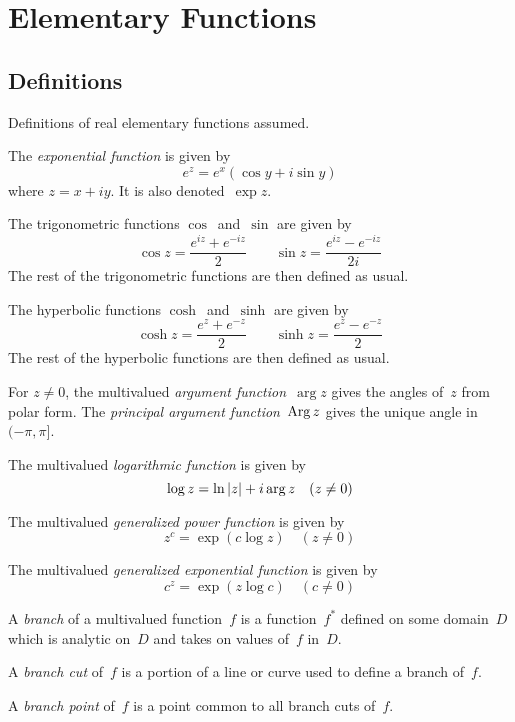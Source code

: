 %
%
%
\section{Elementary Functions}
\subsection*{Definitions}
Definitions of real elementary functions assumed.
\begin{defn}
The \emph{exponential function} is given by
\[e^z=e^x(\cos y+i\sin y)\]
where \(z=x+iy\). It is also denoted~\(\exp z\).
\end{defn}
\begin{defn}
The trigonometric functions \(\cos\)~and~\(\sin\) are given by
\[\cos z=\frac{e^{iz}+e^{-iz}}{2}\qquad\sin z=\frac{e^{iz}-e^{-iz}}{2i}\]
The rest of the trigonometric functions are then defined as usual.
\end{defn}
\begin{defn}
The hyperbolic functions \(\cosh\)~and~\(\sinh\) are given by
\[\cosh z=\frac{e^z+e^{-z}}{2}\qquad\sinh z=\frac{e^z-e^{-z}}{2}\]
The rest of the hyperbolic functions are then defined as usual.
\end{defn}
\begin{defn}
For \(z\ne0\), the multivalued \emph{argument function}~\(\arg z\) gives the angles of~\(z\) from polar form. The \emph{principal argument function}~\(\operatorname{Arg} z\) gives the unique angle in \((-\pi,\pi]\).
\end{defn}
\begin{defn}
The multivalued \emph{logarithmic function} is given by
\[\log z=\ln|{z}|+i\arg z\quad(z\ne0)\]
\end{defn}
\begin{defn}
The multivalued \emph{generalized power function} is given by
\[z^c=\exp(c\log z)\quad(z\ne0)\]
\end{defn}
\begin{defn}
The multivalued \emph{generalized exponential function} is given by
\[c^z=\exp(z\log c)\quad(c\ne0)\]
\end{defn}

\begin{defn}
A \emph{branch} of a multivalued function~\(f\) is a function~\(f^*\) defined on some domain~\(D\) which is analytic on~\(D\) and takes on values of~\(f\) in~\(D\).

A \emph{branch cut} of~\(f\) is a portion of a line or curve used to define a branch of~\(f\).

A \emph{branch point} of~\(f\) is a point common to all branch cuts of~\(f\).
\end{defn}

